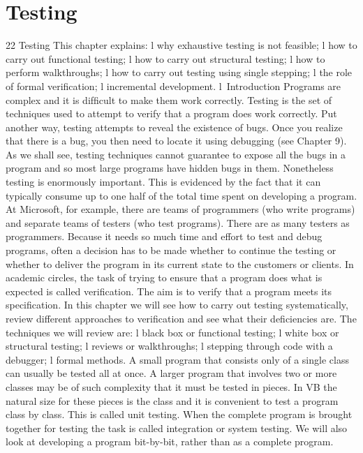 \chapter{Testing}

22
Testing
This chapter explains:
l	why exhaustive testing is not feasible;
l	how to carry out functional testing;
l	how to carry out structural testing;
l	how to perform walkthroughs;
l	how to carry out testing using single stepping;
l	the role of formal veriﬁcation;
l	incremental development.
l Introduction
Programs are complex and it is difﬁcult to make them work correctly. Testing is the set of techniques used to attempt to verify that a program does work correctly. Put another way, testing attempts to reveal the existence of bugs. Once you realize that there is a bug, you then need to locate it using debugging (see Chapter 9). As we shall see, testing techniques cannot guarantee to expose all the bugs in a program and so most large programs have hidden bugs in them. Nonetheless testing is enormously important. This is evidenced by the fact that it can typically consume up to one half of the total time spent on developing a program. At Microsoft, for example, there are teams of programmers (who write programs) and separate teams of testers (who test programs). There are as many testers as programmers. Because it needs so much time and effort to test and debug programs, often a decision has to be made whether to continue the testing or whether to deliver the program in its current state to the customers or clients.
In academic circles, the task of trying to ensure that a program does what is expected is called veriﬁcation. The aim is to verify that a program meets its speciﬁcation.
In this chapter we will see how to carry out testing systematically, review different approaches to veriﬁcation and see what their deﬁciencies are.
The techniques we will review are:
l	black box or functional testing;
l	white box or structural testing;
l	reviews or walkthroughs;
l	stepping through code with a debugger;
l	formal methods.
A small program that consists only of a single class can usually be tested all at once. A larger program that involves two or more classes may be of such complexity that it must be tested in pieces. In VB the natural size for these pieces is the class and it is convenient to test a program class by class. This is called unit testing. When the complete program is brought together for testing the task is called integration or system testing.
We will also look at developing a program bit-by-bit, rather than as a complete 
program.
